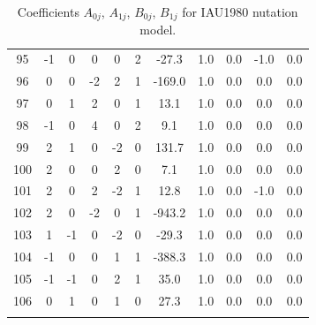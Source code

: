 \documentclass [12pt, a4paper] {article}
\begin{document}
\begin {center}
\begin {longtable}{| c | c c c c c | c | c | c | c | r |}
      95 & -1&   0&   0&   0&   2&     -27.3&       1.0&       0.0&      -1.0&       0.0 \\
      96 & 0&   0&  -2&   2&   1&    -169.0&       1.0&       0.0&       0.0&       0.0 \\
      97 & 0&   1&   2&   0&   1&      13.1&       1.0&       0.0&       0.0&       0.0 \\
      98 & -1&   0&   4&   0&   2&       9.1&       1.0&       0.0&       0.0&       0.0 \\
      99 & 2&   1&   0&  -2&   0&     131.7&       1.0&       0.0&       0.0&       0.0 \\
      100 & 2&   0&   0&   2&   0&       7.1&       1.0&       0.0&       0.0&       0.0 \\
      101 & 2&   0&   2&  -2&   1&      12.8&       1.0&       0.0&      -1.0&       0.0 \\
      102 & 2&   0&  -2&   0&   1&    -943.2&       1.0&       0.0&       0.0&       0.0 \\
      103 & 1&  -1&   0&  -2&   0&     -29.3&       1.0&       0.0&       0.0&       0.0 \\
      104 & -1&   0&   0&   1&   1&    -388.3&       1.0&       0.0&       0.0&       0.0 \\
      105 & -1&  -1&   0&   2&   1&      35.0&       1.0&       0.0&       0.0&       0.0 \\
      106 & 0&   1&   0&   1&   0&      27.3&       1.0&       0.0&       0.0&       0.0 \\
  \hline
  \caption{Coefficients $A_{0j}$, $A_{1j}$, $B_{0j}$, $B_{1j}$ for IAU1980 nutation model.
  \label{table:nutcoeff}}
  \end {longtable}
\end {center}
\end{document}

